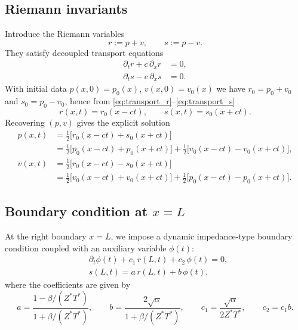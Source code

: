 \documentclass[11pt,a4paper]{report}
\theoremstyle{plain}
\theoremstyle{definition}
\begin{document}
\subsection{Riemann invariants}
Introduce the Riemann variables
\begin{equation}
    r := p+v,\qquad s := p-v.
\end{equation}
They satisfy decoupled transport equations
\begin{align}
    \partial_t r + c\,\partial_x r &= 0, \label{eq:transport_r}\\
    \partial_t s - c\,\partial_x s &= 0. \label{eq:transport_s}
\end{align}
With initial data $p(x,0)=p_0(x)$, $v(x,0)=v_0(x)$ we have $r_0=p_0+v_0$ and $s_0=p_0-v_0$, hence from \eqref{eq:transport_r}--\eqref{eq:transport_s}
\begin{equation}
    r(x,t)=r_0(x-ct),\qquad s(x,t)=s_0(x+ct).
\end{equation}
Recovering $(p,v)$ gives the explicit solution
\begin{align}
    p(x,t) &= \tfrac12\bigl[r_0(x-ct)+s_0(x+ct)\bigr] \nonumber\\
                 &= \tfrac12\bigl[p_0(x-ct)+p_0(x+ct)\bigr] 
                        + \tfrac12\bigl[v_0(x-ct)-v_0(x+ct)\bigr] \label{eq:solution_p}, \\
    v(x,t) &= \tfrac12\bigl[r_0(x-ct)-s_0(x+ct)\bigr] \nonumber\\
                 &= \tfrac12\bigl[v_0(x-ct)+v_0(x+ct)\bigr] 
                        + \tfrac12\bigl[p_0(x-ct)-p_0(x+ct)\bigr] \label{eq:solution_v}.
\end{align}
\subsection{Boundary condition at $x=L$}

At the right boundary $x=L$, we impose a dynamic impedance-type boundary condition
coupled with an auxiliary variable $\phi(t)$:
\begin{align}
&\partial_t \phi(t) + c_1\,r(L,t) + c_2\,\phi(t) = 0, \label{eq:phi_bc} \\
&s(L,t) = a\,r(L,t) + b\,\phi(t), \label{eq:s_bc}
\end{align}
where the coefficients are given by
\begin{equation}
a=\frac{1-\beta/(Z^\ast T^\ast)}{1+\beta/(Z^\ast T^\ast)}, \qquad
b=\frac{2\sqrt{\alpha}}{1+\beta/(Z^\ast T^\ast)}, \qquad
c_1=\frac{\sqrt{\alpha}}{2Z^\ast T^\ast}, \qquad
c_2=c_1 b. \label{eq:coeffs}
\end{equation}
\end{document}
